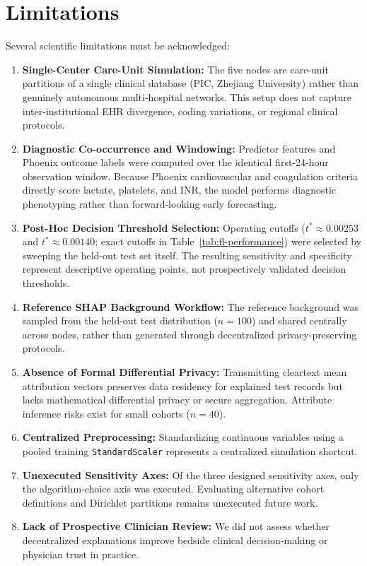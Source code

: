 \documentclass[conference,a4paper]{IEEEtran}
\begin{document}
\section{Limitations}\label{sec:limitations}

Several scientific limitations must be acknowledged:
\begin{enumerate}
\item \textbf{Single-Center Care-Unit Simulation:} The five nodes are care-unit partitions of a single clinical database (PIC, Zhejiang University) rather than genuinely autonomous multi-hospital networks. This setup does not capture inter-institutional EHR divergence, coding variations, or regional clinical protocols.
\item \textbf{Diagnostic Co-occurrence and Windowing:} Predictor features and Phoenix outcome labels were computed over the identical first-24-hour observation window. Because Phoenix cardiovascular and coagulation criteria directly score lactate, platelets, and INR, the model performs diagnostic phenotyping rather than forward-looking early forecasting.
\item \textbf{Post-Hoc Decision Threshold Selection:} Operating cutoffs ($t^* \approx 0.00253$ and $t^* \approx 0.00140$; exact cutoffs in Table~\ref{tab:fl-performance}) were selected by sweeping the held-out test set itself. The resulting sensitivity and specificity represent descriptive operating points, not prospectively validated decision thresholds.
\item \textbf{Reference SHAP Background Workflow:} The reference background was sampled from the held-out test distribution ($n=100$) and shared centrally across nodes, rather than generated through decentralized privacy-preserving protocols.
\item \textbf{Absence of Formal Differential Privacy:} Transmitting cleartext mean attribution vectors preserves data residency for explained test records but lacks mathematical differential privacy or secure aggregation. Attribute inference risks exist for small cohorts ($n=40$).
\item \textbf{Centralized Preprocessing:} Standardizing continuous variables using a pooled training \texttt{StandardScaler} represents a centralized simulation shortcut.
\item \textbf{Unexecuted Sensitivity Axes:} Of the three designed sensitivity axes, only the algorithm-choice axis was executed. Evaluating alternative cohort definitions and Dirichlet partitions remains unexecuted future work.
\item \textbf{Lack of Prospective Clinician Review:} We did not assess whether decentralized explanations improve bedside clinical decision-making or physician trust in practice.
\end{enumerate}
\end{document}
